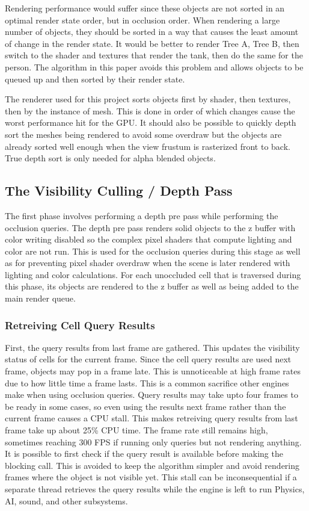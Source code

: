 \documentclass[12pt]{ucthesis}
\begin{document}
Rendering performance would suffer since these objects are not sorted in an optimal render state order, but in occlusion order.
When rendering a large number of objects, they should be sorted in a way that causes the least amount of change in the render state.
It would be better to render Tree A, Tree B, then switch to the shader and textures that render the tank, then do the same for the person.
The algorithm in this paper avoids this problem and allows objects to be queued up and then sorted by their render state.

The renderer used for this project sorts objects first by shader, then textures, then by the instance of mesh.
This is done in order of which changes cause the worst performance hit for the GPU.\cite{d3d10-sys}
It should also be possible to quickly depth sort the meshes being rendered to avoid some overdraw but the objects are already sorted well enough when the view frustum is rasterized front to back.
True depth sort is only needed for alpha blended objects.

\subsection{The Visibility Culling / Depth Pass}
\label{the-visibility-culling-depth-pass}

The first phase involves performing a depth pre pass while performing the occlusion queries.
The depth pre pass renders solid objects to the z buffer with color writing disabled so the complex pixel shaders that compute lighting and color are not run.
This is used for the occlusion queries during this stage as well as for preventing pixel shader overdraw when the scene is later rendered with lighting and color calculations.
For each unoccluded cell that is traversed during this phase, its objects are rendered to the z buffer as well as being added to the main render queue.

\subsubsection{Retreiving Cell Query Results}
\label{retreiving-cell-query-results}

First, the query results from last frame are gathered.
This updates the visibility status of cells for the current frame.
Since the cell query results are used next frame, objects may pop in a frame late.
This is unnoticeable at high frame rates due to how little time a frame lasts.
This is a common sacrifice other engines make when using occlusion queries.
Query results may take upto four frames to be ready in some cases, so even using the results next frame rather than the current frame causes a CPU stall.
This makes retreiving query results from last frame take up about 25\% CPU time.
The frame rate still remains high, sometimes reaching 300 FPS if running only queries but not rendering anything.
It is possible to first check if the query result is available before making the blocking call.
This is avoided to keep the algorithm simpler and avoid rendering frames where the object is not visible yet.
This stall can be inconsequential if a separate thread retrieves the query results while the engine is left to run Physics, AI, sound, and other subsystems.
\end{document}
